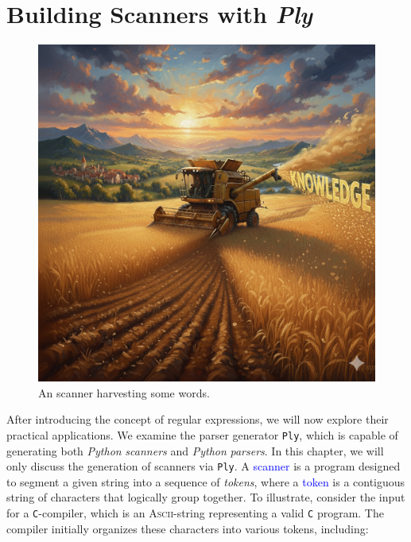 \chapter{Building Scanners with \textsl{Ply} \label{chapter:ply-lex}}
\begin{figure}[h] 
\centering
  \includegraphics[width=12.5cm]{Abbildungen/harvester.png}
\caption{An scanner harvesting some words.}
\label{fig:harvester.png}
\end{figure}


After introducing the concept of regular expressions, we will now explore their practical applications. We
examine the parser generator \texttt{Ply}, which is capable of generating both \textsl{Python}
\emph{scanners} and \textsl{Python} \emph{parsers}.  In this chapter, we will only discuss the generation of
scanners via \texttt{Ply}.
A \textcolor{blue}{scanner} is a program
designed to segment a given string into a sequence of \emph{tokens}, where a
\textcolor{blue}{token} is a contiguous string of characters that logically group together. To
illustrate, consider the input for a \texttt{C}-compiler, which is an \textsc{Ascii}-string representing a
valid \texttt{C} program. The compiler initially organizes these characters into various tokens, including: 

